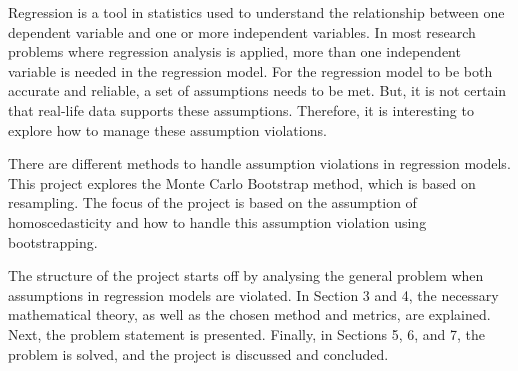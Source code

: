 
Regression is a tool in statistics used to understand the relationship between one dependent variable and one or more independent variables. In most research problems where regression analysis is applied, more than one independent variable is needed in the regression model. For the regression model to be both accurate and reliable, a set of assumptions needs to be met. But, it is not certain that real-life data supports these assumptions. Therefore, it is interesting to explore how to manage these assumption violations. \newline

\noindent There are different methods to handle assumption violations in regression models. This project explores the  Monte Carlo Bootstrap method, which is based on resampling. The focus of the project is based on the assumption of homoscedasticity and how to handle this assumption violation using bootstrapping.\newline

\noindent The structure of the project starts off by analysing the general problem when assumptions in regression models are violated. In Section 3 and 4, the necessary mathematical theory, as well as the chosen method and metrics, are explained. Next, the problem statement is presented. Finally, in Sections 5, 6, and 7, the problem is solved, and the project is discussed and concluded.